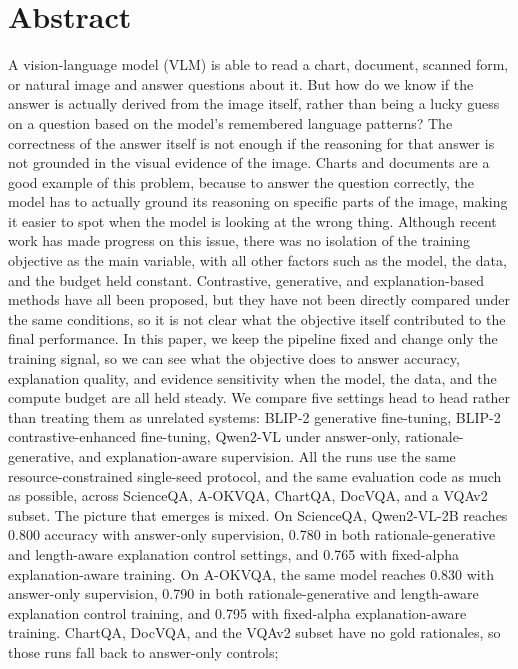 \chapter*{Abstract}
A vision-language model (VLM) is able to read a chart, document, scanned form, or natural image and answer questions about it. 
But how do we know if the answer is actually derived from the image itself, rather than being a lucky guess on a question based on the model's remembered language patterns?
The correctness of the answer itself is not enough if the reasoning for that answer is not grounded in the visual evidence of the image.
Charts and documents are a good example of this problem, because to answer the question correctly, the model has to actually ground its reasoning on specific parts of the image,
making it easier to spot when the model is looking at the wrong thing. Although recent work has made progress on this issue,
there was no isolation of the training objective as the main variable, with all other factors such as the model, the data, and the budget held constant.
Contrastive, generative, and explanation-based methods have all been proposed, but they have not been directly compared under the same conditions,
so it is not clear what the objective itself contributed to the final performance. 
In this paper, we keep the pipeline fixed and change only the training signal, so we can see what the objective does to answer accuracy, explanation quality, 
and evidence sensitivity when the model, the data, and the compute budget are all held steady.
We compare five settings head to head rather than treating them as unrelated systems: BLIP-2 generative fine-tuning, BLIP-2 contrastive-enhanced fine-tuning,
Qwen2-VL under answer-only, rationale-generative, and explanation-aware supervision.
All the runs use the same resource-constrained single-seed protocol, and the same evaluation code as much as possible,
across ScienceQA, A-OKVQA, ChartQA, DocVQA, and a VQAv2 subset.
The picture that emerges is mixed. On ScienceQA, Qwen2-VL-2B reaches 0.800 accuracy with answer-only supervision,
0.780 in both rationale-generative and length-aware explanation control settings, and 0.765 with fixed-alpha explanation-aware training.
On A-OKVQA, the same model reaches 0.830 with answer-only supervision, 0.790 in both rationale-generative and length-aware explanation control training,
and 0.795 with fixed-alpha explanation-aware training.
ChartQA, DocVQA, and the VQAv2 subset have no gold rationales, so those runs fall back to answer-only controls;
